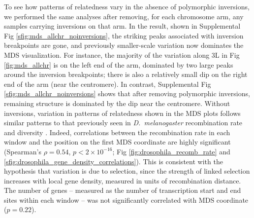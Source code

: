 \documentclass[11pt, oneside]{article}   	%
\newcommand\citep{\cite}
\newcommand{\Figure}{Fig }
\newcommand{\Figures}{Fig }
\newcommand{\Figure}{{Figure }}
\newcommand{\Figures}{{Figures }}
\begin{document}
To see how patterns of relatedness vary in the absence of polymorphic inversions,
we performed the same analyses after removing, for each chromosome arm,
any samples carrying inversions on that arm.
In the result, shown in Supplemental \Figure \ref{sfig:mds_allchr_noinversions},
the striking peaks associated with inversion breakpoints are gone,
and previously smaller-scale variation now dominates the MDS visualization.
For instance, the majority of the variation along 3L in \Figure \ref{fig:mds_allchr}
is on the left end of the arm, dominated by two large peaks around the inversion breakpoints;
there is also a relatively small dip on the right end of the arm (near the centromere).
In contrast, Supplemental \Figure \ref{sfig:mds_allchr_noinversions} shows that after removing polymorphic inversions,
remaining structure is dominated by the dip near the centromere.
Without inversions, variation in patterns of relatedness shown in the MDS plots
follows similar patterns to that previously seen in \textit{D.~melanogaster} recombination rate and diversity \citep{langley2012genomic,mackay2012drosophila}.
Indeed, correlations between the recombination rate in each window and the position on the first MDS coordinate are highly significant
(Spearman's $\rho=0.54$, $p<2 \times 10^{-16}$; \Figures \ref{fig:drosophila_recomb_rate} and \ref{sfig:drosophila_gene_density_correlations}).
This is consistent with the hypothesis that variation
is due to selection, since the strength of linked selection increases with local gene density, 
measured in units of recombination distance.
The number of genes -- measured as the number of transcription start and end sites within each window --
was not significantly correlated with MDS coordinate ($p=0.22$).
\end{document}
